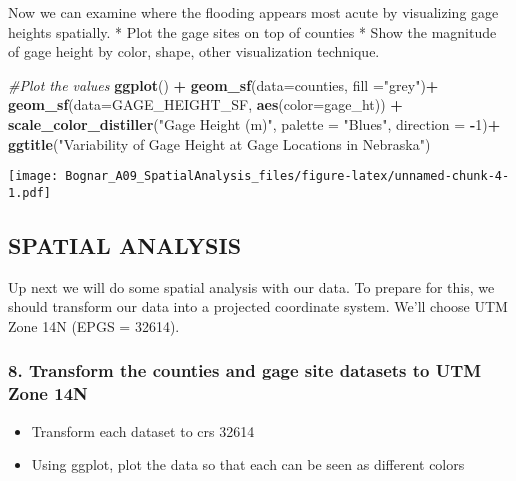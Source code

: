 \documentclass[]{article}
\newenvironment{Shaded}{\begin{snugshade}}{\end{snugshade}}
\newcommand{\KeywordTok}[1]{\textcolor[rgb]{0.13,0.29,0.53}{\textbf{#1}}}
\newcommand{\DataTypeTok}[1]{\textcolor[rgb]{0.13,0.29,0.53}{#1}}
\newcommand{\DecValTok}[1]{\textcolor[rgb]{0.00,0.00,0.81}{#1}}
\newcommand{\StringTok}[1]{\textcolor[rgb]{0.31,0.60,0.02}{#1}}
\newcommand{\CommentTok}[1]{\textcolor[rgb]{0.56,0.35,0.01}{\textit{#1}}}
\newcommand{\OperatorTok}[1]{\textcolor[rgb]{0.81,0.36,0.00}{\textbf{#1}}}
\newcommand{\NormalTok}[1]{#1}
\providecommand{\tightlist}{%
  \setlength{\itemsep}{0pt}\setlength{\parskip}{0pt}}
\begin{document}
Now we can examine where the flooding appears most acute by visualizing
gage heights spatially. * Plot the gage sites on top of counties * Show
the magnitude of gage height by color, shape, other visualization
technique.

\begin{Shaded}
\begin{Highlighting}[]
\CommentTok{#Plot the values}
\KeywordTok{ggplot}\NormalTok{() }\OperatorTok{+}\StringTok{ }
\StringTok{  }\KeywordTok{geom_sf}\NormalTok{(}\DataTypeTok{data=}\NormalTok{counties, }\DataTypeTok{fill =}\StringTok{"grey"}\NormalTok{)}\OperatorTok{+}
\StringTok{  }\KeywordTok{geom_sf}\NormalTok{(}\DataTypeTok{data=}\NormalTok{GAGE_HEIGHT_SF, }\KeywordTok{aes}\NormalTok{(}\DataTypeTok{color=}\NormalTok{gage_ht)) }\OperatorTok{+}
\StringTok{ }\KeywordTok{scale_color_distiller}\NormalTok{(}\StringTok{"Gage Height (m)"}\NormalTok{, }\DataTypeTok{palette =} \StringTok{"Blues"}\NormalTok{, }\DataTypeTok{direction =} \OperatorTok{-}\DecValTok{1}\NormalTok{)}\OperatorTok{+}
\StringTok{  }\KeywordTok{ggtitle}\NormalTok{(}\StringTok{"Variability of Gage Height at Gage Locations in Nebraska"}\NormalTok{)}
\end{Highlighting}
\end{Shaded}

\texttt{[image: Bognar\_A09\_SpatialAnalysis\_files/figure-latex/unnamed-chunk-4-1.pdf]}

\subsection{SPATIAL ANALYSIS}\label{spatial-analysis}

Up next we will do some spatial analysis with our data. To prepare for
this, we should transform our data into a projected coordinate system.
We'll choose UTM Zone 14N (EPGS = 32614).

\subsubsection{8. Transform the counties and gage site datasets to UTM
Zone
14N}\label{transform-the-counties-and-gage-site-datasets-to-utm-zone-14n}

\begin{itemize}
\tightlist
\item
  Transform each dataset to crs 32614
\item
  Using ggplot, plot the data so that each can be seen as different
  colors
\end{itemize}
\end{document}
